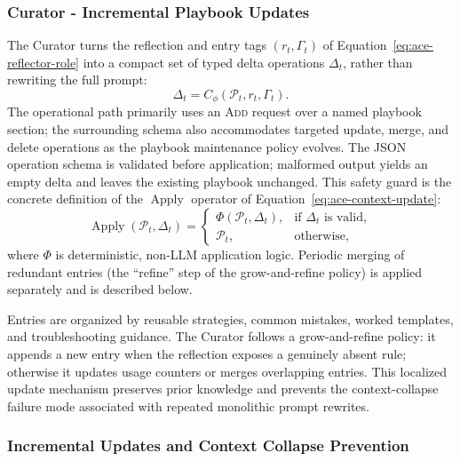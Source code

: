 \documentclass[10pt,conference]{IEEEtran}
\begin{document}
\subsubsection{Curator - Incremental Playbook Updates}
\label{subsubsec:ace-curator}

The Curator turns the reflection and entry tags $(r_t,\Gamma_t)$ of
Equation~\eqref{eq:ace-reflector-role} into a compact set of typed delta
operations $\Delta_t$, rather than rewriting the full prompt:
\begin{equation}
    \Delta_t = C_\phi(\mathcal{P}_t,r_t,\Gamma_t).
    \label{eq:ace-curator-role}
\end{equation}
The operational path
primarily uses an \textsc{Add} request over a named playbook section;
the surrounding schema also accommodates targeted update, merge, and 
delete operations as the playbook maintenance policy evolves. The JSON 
operation schema is validated before application; malformed output yields 
an empty delta and leaves the existing playbook unchanged. This safety
guard is the concrete definition of the $\operatorname{Apply}$ operator
of Equation~\eqref{eq:ace-context-update}:
\begin{equation}
    \operatorname{Apply}(\mathcal{P}_t,\Delta_t)=\begin{cases}
    \Phi(\mathcal{P}_t,\Delta_t), & \text{if }\Delta_t\text{ is valid},\\
    \mathcal{P}_t, & \text{otherwise},
    \end{cases}
    \label{eq:ace-safe-curation}
\end{equation}
where $\Phi$ is deterministic, non-LLM application logic. Periodic
merging of redundant entries (the ``refine'' step of the grow-and-refine
policy) is applied separately and is described below.

Entries are organized by reusable strategies, common mistakes, worked 
templates, and troubleshooting guidance. The Curator follows a 
grow-and-refine policy: it appends a new entry when the reflection exposes 
a genuinely absent rule; otherwise it updates usage counters or merges 
overlapping entries. This localized update mechanism preserves prior 
knowledge and prevents the context-collapse failure mode associated with 
repeated monolithic prompt rewrites.

\subsubsection{Incremental Updates and Context Collapse Prevention}
\label{subsubsec:ace-update}
\end{document}
